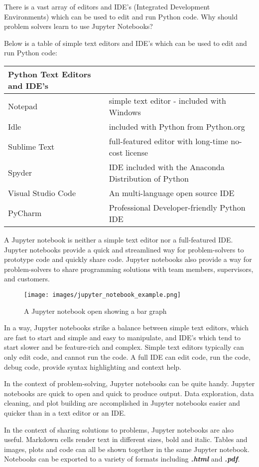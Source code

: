 \documentclass{book}
\makeatletter
\def\maxwidth{\ifdim\Gin@nat@width>\linewidth\linewidth
\else\Gin@nat@width\fi}
\let\Oldincludegraphics\includegraphics
\renewcommand{\includegraphics}[1]{\Oldincludegraphics[width=.8\maxwidth]{#1}}
\makeatother
\begin{document}
    
        There is a vast array of editors and IDE's (Integrated Development
Environments) which can be used to edit and run Python code. Why should
problem solvers learn to use Jupyter Notebooks?

Below is a table of simple text editors and IDE's which can be used to
edit and run Python code:

\begin{longtable}[]{@{}ll@{}}
\toprule
Python Text Editors and IDE's &\tabularnewline
\midrule
\endhead
Notepad & simple text editor - included with Windows\tabularnewline
Idle & included with Python from Python.org\tabularnewline
Sublime Text & full-featured editor with long-time no-cost
license\tabularnewline
Spyder & IDE included with the Anaconda Distribution of
Python\tabularnewline
Visual Studio Code & An multi-language open source IDE\tabularnewline
PyCharm & Professional Developer-friendly Python IDE\tabularnewline
\bottomrule
\end{longtable}

A Jupyter notebook is neither a simple text editor nor a full-featured
IDE. Jupyter notebooks provide a quick and streamlined way for
problem-solvers to prototype code and quickly share code. Jupyter
notebooks also provide a way for problem-solvers to share programming
solutions with team members, supervisors, and customers.

\begin{figure}
\centering
\texttt{[image: images/jupyter\_notebook\_example.png]}
\caption{A Jupyter notebook open showing a bar graph}
\end{figure}

In a way, Jupyter notebooks strike a balance between simple text
editors, which are fast to start and simple and easy to manipulate, and
IDE's which tend to start slower and be feature-rich and complex. Simple
text editors typically can only edit code, and cannot run the code. A
full IDE can edit code, run the code, debug code, provide syntax
highlighting and context help.
    




    
        In the context of problem-solving, Jupyter notebooks can be quite handy.
Jupyter notebooks are quick to open and quick to produce output. Data
exploration, data cleaning, and plot building are accomplished in
Jupyter notebooks easier and quicker than in a text editor or an IDE.

In the context of sharing solutions to problems, Jupyter notebooks are
also useful. Markdown cells render text in different sizes, bold and
italic. Tables and images, plots and code can all be shown together in
the same Jupyter notebook. Notebooks can be exported to a variety of
formats including \textbf{\emph{.html}} and \textbf{\emph{.pdf}}.
    
\end{document}
